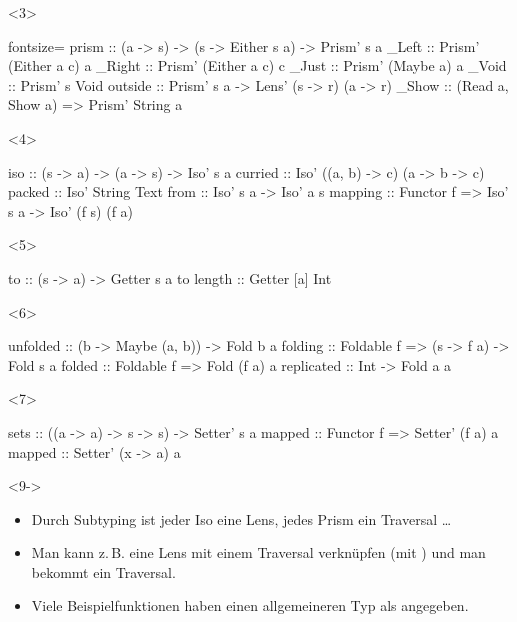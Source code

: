 \documentclass{beamer}
\begin{document}
\begin{frame}[t,fragile]
  \begin{onlyenv}<3>
\begin{haskellcode*}{fontsize=\small}
prism :: (a -> s) -> (s -> Either s a) -> Prism' s a
_Left :: Prism' (Either a c) a    _Right :: Prism' (Either a c) c
_Just :: Prism' (Maybe a) a       _Void :: Prism' s Void
outside :: Prism' s a -> Lens' (s -> r) (a -> r)
_Show :: (Read a, Show a) => Prism' String a
\end{haskellcode*}
  \end{onlyenv}

  \begin{onlyenv}<4>
\begin{haskellcode}
iso :: (s -> a) -> (a -> s) -> Iso' s a
curried :: Iso' ((a, b) -> c) (a -> b -> c)
packed :: Iso' String Text
from :: Iso' s a -> Iso' a s
mapping :: Functor f => Iso' s a -> Iso' (f s) (f a)
\end{haskellcode}
  \end{onlyenv}

  \begin{onlyenv}<5>
\begin{haskellcode}
to :: (s -> a) -> Getter s a
to length :: Getter [a] Int
\end{haskellcode}
  \end{onlyenv}

  \begin{onlyenv}<6>
\begin{haskellcode}
unfolded :: (b -> Maybe (a, b)) -> Fold b a
folding :: Foldable f => (s -> f a) -> Fold s a
folded  :: Foldable f => Fold (f a) a
replicated :: Int -> Fold a a
\end{haskellcode}
  \end{onlyenv}

  \begin{onlyenv}<7>
\begin{haskellcode}
sets :: ((a -> a) -> s -> s) -> Setter' s a
mapped :: Functor f => Setter' (f a) a
mapped :: Setter' (x -> a) a
\end{haskellcode}
  \end{onlyenv}

  {\small
  \begin{onlyenv}<9->
    \begin{itemize}
      \item<9-> Durch Subtyping ist jeder Iso eine Lens, jedes Prism ein Traversal \ldots
      \item<10-> Man kann z.\,B. eine Lens mit einem Traversal verknüpfen (mit ) und man bekommt ein Traversal.
      \item<11-> Viele Beispielfunktionen haben einen allgemeineren Typ als angegeben.
    \end{itemize}
  \end{onlyenv}}


\end{frame}
\end{document}
